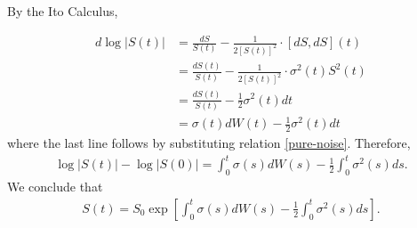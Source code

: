 \documentclass[12pt,reqno]{amsart}
\numberwithin{equation}{section}  %
\begin{document}
By the Ito Calculus,

\begin{equation*}
\begin{split}
d \log | S(t) |
& = \frac{dS}{S(t)} -\frac{1}{2[S(t)]^{2}} \cdot [dS, dS](t)
\\
& = \frac{dS(t)}{S(t)}  -\frac{1}{2[S(t)]^{2}} \cdot \sigma^{2}(t) S^{2}(t)
\\
& = \frac{dS(t)}{S(t)} - \frac{1}{2} \sigma^{2}(t) dt
\\
& = \sigma(t) d W(t) - \frac{1}{2} \sigma^{2}(t) dt
\end{split}
\end{equation*}
where the last line follows by substituting relation \eqref{pure-noise}. Therefore,
\begin{equation*}
\begin{split}
  \log | S(t) | - \log | S(0) | = \int_{0}^{t} \sigma(s) dW(s) -\frac{1}{2} \int_{0}^{t} \sigma^{2}(s) ds.
\end{split}
\end{equation*}
We conclude that
\begin{equation*}
\begin{split}
S(t) = S_{0} \exp[\int_{0}^{t} \sigma(s) dW(s) - \frac{1}{2} \int_{0}^{t} \sigma^{2}(s) ds].
\end{split}
\end{equation*}


        
\end{document}
